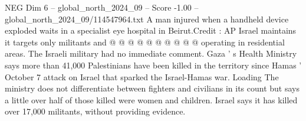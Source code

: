 \begin{textsample}{NEG Dim 6 – global\_north\_2024\_09 – Score -1.00 – global\_north\_2024\_09/114547964.txt}
A man injured when a handheld device exploded waits in a specialist eye hospital in Beirut.Credit : AP Israel maintains it targets only militants and @ @ @ @ @ @ @ @ @ @ operating in residential areas.
The Israeli military had no immediate comment.
Gaza ' s Health Ministry says more than 41,000 Palestinians have been killed in the territory since Hamas ' October 7 attack on Israel that sparked the Israel-Hamas war.
Loading The ministry does not differentiate between fighters and civilians in its count but says a little over half of those killed were women and children.
Israel says it has killed over 17,000 militants, without providing evidence.

\end{textsample}
